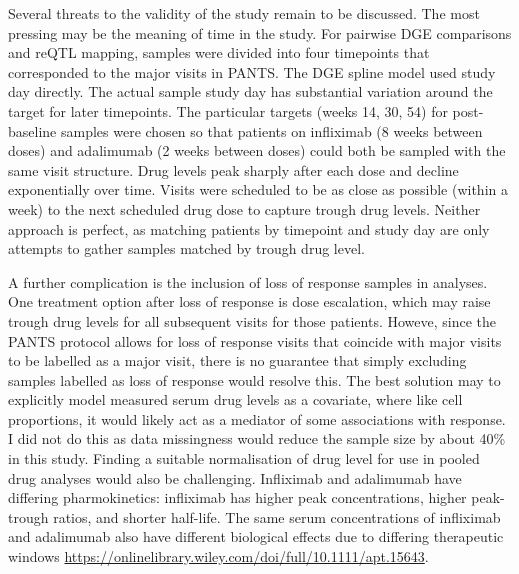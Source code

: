 \begin{outline}
Several threats to the validity of the study remain to be discussed.
The most pressing may be the meaning of time in the study.
For pairwise \gls{DGE} comparisons and \gls{reQTL} mapping, 
samples were divided into four timepoints that corresponded to the major visits in \gls{PANTS}.
The \gls{DGE} spline model used study day directly.
The actual sample study day has substantial variation around the target for later timepoints.
The particular targets (weeks 14, 30, 54) for post-baseline samples were chosen so that patients on infliximab (8 weeks between doses) and adalimumab (2 weeks between doses) could both be sampled with the same visit structure.
Drug levels peak sharply after each dose and decline exponentially over time.
Visits were scheduled to be as close as possible (within a week) to the next scheduled drug dose to capture trough drug levels.
Neither approach is perfect, as matching patients by timepoint and study day are only attempts to gather samples matched by trough drug level.

A further complication is the inclusion of loss of response samples in analyses.
One treatment option after loss of response is dose escalation, which may raise trough drug levels for all subsequent visits for those patients.
Howeve, since the \gls{PANTS} protocol allows for loss of response visits that coincide with major visits to be labelled as a major visit,
there is no guarantee that simply excluding samples labelled as loss of response would resolve this.
The best solution may to explicitly model measured serum drug levels as a covariate, where like cell proportions, it would likely act as a mediator of some associations with response.
I did not do this as data missingness would reduce the sample size by about 40\% in this study.
Finding a suitable normalisation of drug level for use in pooled drug analyses would also be challenging.
Infliximab and adalimumab have differing pharmokinetics: infliximab has higher peak concentrations, higher peak-trough ratios, and shorter half-life.
The same serum concentrations of infliximab and adalimumab also have different biological effects due to differing therapeutic windows
\autocite{tracey2008TumorNecrosisFactor,lichtenstein2013ComprehensiveReviewAntitumor} \url{https://onlinelibrary.wiley.com/doi/full/10.1111/apt.15643}.


\end{outline}
